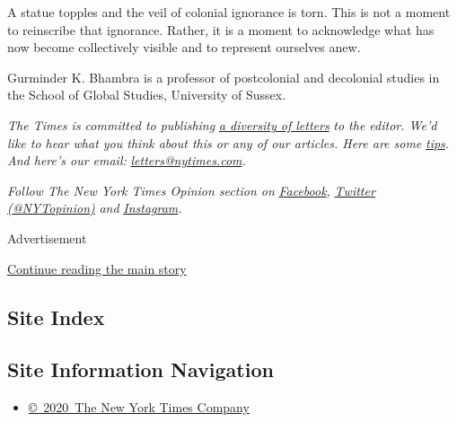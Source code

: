 A statue topples and the veil of colonial ignorance is torn. This is not
a moment to reinscribe that ignorance. Rather, it is a moment to
acknowledge what has now become collectively visible and to represent
ourselves anew.

Gurminder K. Bhambra is a professor of postcolonial and decolonial
studies in the School of Global Studies, University of Sussex.

\emph{The Times is committed to publishing}
\href{https://www.nytimes.com/2019/01/31/opinion/letters/letters-to-editor-new-york-times-women.html}{\emph{a
diversity of letters}} \emph{to the editor. We'd like to hear what you
think about this or any of our articles. Here are some}
\href{https://help.nytimes.com/hc/en-us/articles/115014925288-How-to-submit-a-letter-to-the-editor}{\emph{tips}}\emph{.
And here's our email:}
\href{mailto:letters@nytimes.com}{\emph{letters@nytimes.com}}\emph{.}

\emph{Follow The New York Times Opinion section on}
\href{https://www.facebook.com/nytopinion}{\emph{Facebook}}\emph{,}
\href{http://twitter.com/NYTOpinion}{\emph{Twitter (@NYTopinion)}}
\emph{and}
\href{https://www.instagram.com/nytopinion/}{\emph{Instagram}}\emph{.}

Advertisement

\protect\hyperlink{after-bottom}{Continue reading the main story}

\hypertarget{site-index}{%
\subsection{Site Index}\label{site-index}}

\hypertarget{site-information-navigation}{%
\subsection{Site Information
Navigation}\label{site-information-navigation}}

\begin{itemize}
\tightlist
\item
  \href{https://help.nytimes.com/hc/en-us/articles/115014792127-Copyright-notice}{©~2020~The
  New York Times Company}
\end{itemize}

